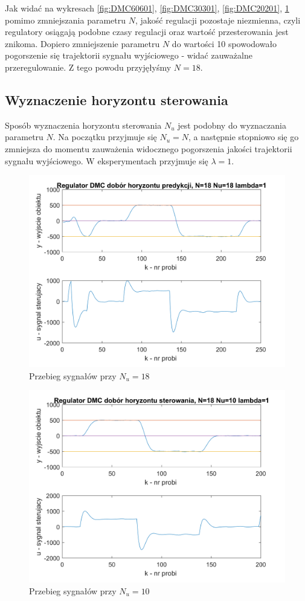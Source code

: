 \documentclass[a4paper, 10pt]{article}
\begin{document}
Jak widać na wykresach \ref{fig:DMC60601}, \ref{fig:DMC30301}, \ref{fig:DMC20201}, \ref{fig:DMC18181} pomimo zmniejszania parametru $N$, jakość regulacji pozostaje niezmienna, czyli regulatory osiągają podobne czasy regulacji oraz wartość przesterowania jest znikoma. Dopiero zmniejszenie parametru $N$ do wartości 10 spowodowało pogorszenie się trajektorii sygnału wyjściowego - widać zauważalne przeregulowanie. Z tego powodu przyjęłyśmy $N=18$.

\subsection{Wyznaczenie horyzontu sterowania}
Sposób wyznaczenia horyzontu sterowania $N_{u}$ jest podobny do wyznaczania parametru $N$. Na początku przyjmuje się $N_{u}=N$, a następnie stopniowo się go zmniejsza do momentu zauważenia widocznego pogorszenia jakości trajektorii sygnału wyjściowego. W eksperymentach przyjmuje się $\lambda=1$.
\begin{figure}[H]
	\centering
	\includegraphics[width=0.9\linewidth]{DMC18181}
	\caption{Przebieg sygnałów przy $N_{u}=18$}
	\label{fig:DMC18181}
\end{figure}
\begin{figure}[H]
	\centering
	\includegraphics[width=0.9\linewidth]{DMC18101}
	\caption{Przebieg sygnałów przy $N_{u}=10$}
	\label{fig:DMC18101}
\end{figure}
\end{document}

